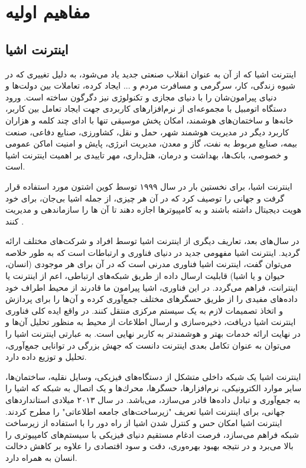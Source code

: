 \chapter{مفاهیم اولیه}
\section{اینترنت اشیا}
اینترنت اشیا که از آن به عنوان انقلاب صنعتی جدید یاد می‌شود، به دلیل تغییری که در شیوه زندگی، کار، سرگرمی و مسافرت مردم و ... ایجاد کرده، تعاملات بین دولت‌ها و دنیای پیرامون‌شان را با دنیای مجازی و تكنولوژی نیز دگرگون ساخته است. ورود دستگاه اتومبیل با مجموعه‌ای از نرم‌افزارهای کاربردی جهت ایجاد تعامل بین کاربر، خانه‌ها و ساختمان‌های هوشمند، امكان پخش موسیقی تنها با ادای چند کلمه و هزاران کاربرد دیگر در مدیریت هوشمند شهر، حمل و نقل، کشاورزی، صنایع دفاعی،
صنعت بیمه، صنایع مربوط به نفت، گاز و معدن، مدیریت انرژی، پایش و امنیت اماکن عمومی و
خصوصی، بانک‌ها، بهداشت و درمان، هتل‌داری، مهر تاییدی بر اهمیت اینترنت اشیا است.


اینترنت اشیا، برای نخستین بار در سال ۱۹۹۹ توسط کوین اشتون مورد استفاده قرار گرفت و جهانی را توصیف کرد که در آن هر چیزی، از جمله اشیا بی‌جان، برای خود هویت دیجیتال داشته باشند و به کامپیوترها اجازه دهند تا آن ها را سازماندهی و مدیریت کنند \cite{Madakam2015}.


در سال‌های بعد، تعاریف دیگری از اینترنت اشیا توسط افراد و شرکت‌های مختلف ارائه گردید. اینترنت اشیا مفهومی جدید در دنیای فناوری و ارتباطات است که به طور خلاصه می‌توان گفت، اینترنت اشیا فناوری مدرنی است که در آن برای هر موجودی (انسان، حیوان و یا اشیا) قابلیت ارسال داده از طریق شبكه‌های ارتباطی، اعم از اینترنت یا اینترانت، فراهم می‌گردد. در این فناوری، اشیا پیرامون ما قادرند از محیط اطراف خود داده‌های مفیدی را از طریق حسگرهای مختلف جمع‌آوری کرده و آن‌ها را برای پردازش و اتخاذ تصمیمات لازم به یک سیستم مرکزی منتقل کنند. در واقع ایده کلی فناوری اینترنت اشیا دریافت، ذخیره‌سازی و ارسال اطلاعات از محیط به منظور تحلیل آن‌ها و در نهایت ارائه خدمات بهتر و هوشمندتر به کاربر نهایی است. به عبارتی اینترنت اشیا را می‌توان به عنوان تكامل بعدی اینترنت دانست که جهش بزرگی در توانایی جمع‌آوری، تحلیل و توزیع داده دارد.


اینترنت اشیا یک شبكه داخلی متشکل از دستگاه‌های فیزیکی، وسایل نقلیه، ساختمان‌ها، سایر موارد الكترونیكی، نرم‌افزارها، حسگرها، محرك‌ها و یک اتصال به شبكه که اشیا را به جمع‌آوری و تبادل
داده‌ها قادر می‌سازد، می‌باشد. در سال ۲۰۱۳ میلادی استانداردهای جهانی، برای اینترنت اشیا تعریف "زیرساخت‌های جامعه اطلاعاتی" را مطرح کردند. اینترنت اشیا امكان حس و کنترل شدن اشیا از راه دور را با استفاده از زیرساخت شبكه فراهم می‌سازد، فرصت ادغام مستقیم دنیای فیزیكی با سیستم‌های کامپیوتری را بالا می‌برد و در نتیجه بهبود بهره‌وری، دقت و سود اقتصادی را علاوه بر کاهش دخالت انسان به همراه دارد.
